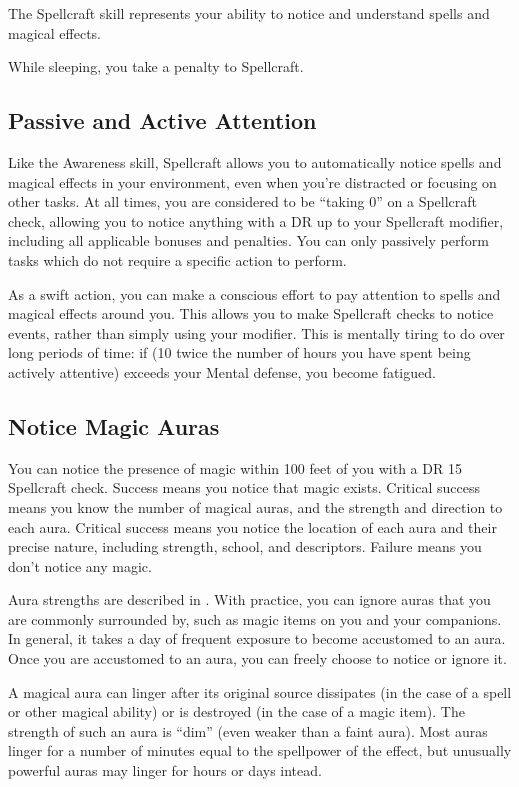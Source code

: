         The Spellcraft skill represents your ability to notice and understand spells and magical effects.

        While sleeping, you take a  penalty to Spellcraft.

    \subsection{Passive and Active Attention}\label{Spellcraft-Passive and Active Attention}
        Like the Awareness skill, Spellcraft allows you to automatically notice spells and magical effects in your environment, even when you're distracted or focusing on other tasks. At all times, you are considered to be ``taking 0'' on a Spellcraft check, allowing you to notice anything with a DR up to your Spellcraft modifier, including all applicable bonuses and penalties. You can only passively perform tasks which do not require a specific action to perform.

        As a swift action, you can make a conscious effort to pay attention to spells and magical effects around you. This allows you to make Spellcraft checks to notice events, rather than simply using your modifier. This is mentally tiring to do over long periods of time: if (10 \add twice the number of hours you have spent being actively attentive) exceeds your Mental defense, you become fatigued.

    \subsection{Notice Magic Auras}
        You can notice the presence of magic within 100 feet of you with a DR 15 Spellcraft check. Success means you notice that magic exists. Critical success means you know the number of magical auras, and the strength and direction to each aura. Critical success means you notice the location of each aura and their precise nature, including strength, school, and descriptors. Failure means you don't notice any magic.

        Aura strengths are described in . With practice, you can ignore auras that you are commonly surrounded by, such as magic items on you and your companions. In general, it takes a day of frequent exposure to become accustomed to an aura. Once you are accustomed to an aura, you can freely choose to notice or ignore it.

        A magical aura can linger after its original source dissipates (in the case of a spell or other magical ability) or is destroyed (in the case of a magic item). The strength of such an aura is ``dim'' (even weaker than a faint aura). Most auras linger for a number of minutes equal to the spellpower of the effect, but unusually powerful auras may linger for hours or days intead.

